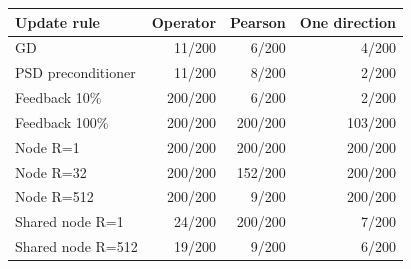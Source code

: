 \begin{tabular}{lrrr}
\hline
Update rule & Operator & Pearson & One direction\\
\hline
GD & 11/200 & 6/200 & 4/200\\
PSD preconditioner & 11/200 & 8/200 & 2/200\\
Feedback 10\% & 200/200 & 6/200 & 2/200\\
Feedback 100\% & 200/200 & 200/200 & 103/200\\
Node R=1 & 200/200 & 200/200 & 200/200\\
Node R=32 & 200/200 & 152/200 & 200/200\\
Node R=512 & 200/200 & 9/200 & 200/200\\
Shared node R=1 & 24/200 & 200/200 & 7/200\\
Shared node R=512 & 19/200 & 9/200 & 6/200\\
\hline
\end{tabular}
